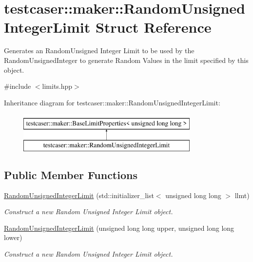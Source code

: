 \hypertarget{structtestcaser_1_1maker_1_1RandomUnsignedIntegerLimit}{}\section{testcaser\+::maker\+::Random\+Unsigned\+Integer\+Limit Struct Reference}
\label{structtestcaser_1_1maker_1_1RandomUnsignedIntegerLimit}


Generates an Random\+Unsigned Integer Limit to be used by the Random\+Unsigned\+Integer to generate Random Values in the limit specified by this object.  




{\ttfamily \#include $<$limits.\+hpp$>$}

Inheritance diagram for testcaser\+::maker\+::Random\+Unsigned\+Integer\+Limit\+:\begin{figure}[H]
\begin{center}
\leavevmode
\includegraphics[height=2.000000cm]{structtestcaser_1_1maker_1_1RandomUnsignedIntegerLimit}
\end{center}
\end{figure}
\subsection*{Public Member Functions}
\begin{DoxyCompactItemize}
\item 
\mbox{\hyperlink{structtestcaser_1_1maker_1_1RandomUnsignedIntegerLimit_a8535b952828f59d17c69caae62f4c4e1}{Random\+Unsigned\+Integer\+Limit}} (std\+::initializer\+\_\+list$<$ unsigned long long $>$ llmt)
\begin{DoxyCompactList}\small\item\em Construct a new Random Unsigned Integer Limit object. \end{DoxyCompactList}\item 
\mbox{\hyperlink{structtestcaser_1_1maker_1_1RandomUnsignedIntegerLimit_a4299cc026c1ed26b595c248c6e243f8c}{Random\+Unsigned\+Integer\+Limit}} (unsigned long long upper, unsigned long long lower)
\begin{DoxyCompactList}\small\item\em Construct a new Random Unsigned Integer Limit object. \end{DoxyCompactList}\end{DoxyCompactItemize}
